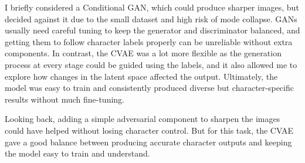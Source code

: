 \documentclass[11pt]{report} %
\begin{document}
I briefly considered a Conditional GAN, which could produce sharper images, but decided against it due to the small dataset and high risk of mode collapse. GANs usually need careful tuning to keep the generator and discriminator balanced, and getting them to follow character labels properly can be unreliable without extra components. In contrast, the CVAE was a lot more flexible as the generation process at every stage could be guided using the labels, and it also allowed me to explore how changes in the latent space affected the output. Ultimately, the model was easy to train and consistently produced diverse but character-specific results without much fine-tuning.

Looking back, adding a simple adversarial component to sharpen the images could have helped without losing character control. But for this task, the CVAE gave a good balance between producing accurate character outputs and keeping the model easy to train and understand.

\makeatletter
\renewcommand\@biblabel[1]{#1.} %
\makeatother


\end{document}
